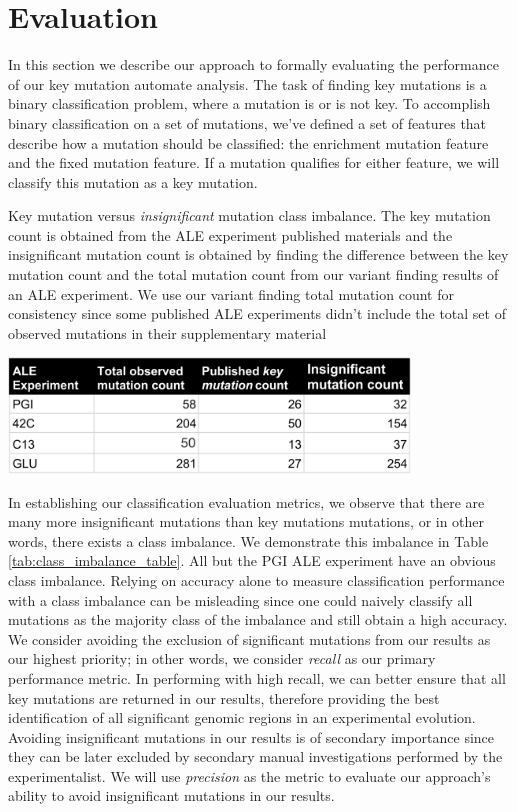 \documentclass[12pt,final,masters,chapterheads]{ucsd}  %
\begin{document}
\section{Evaluation}
In this section we describe our approach to formally evaluating the performance of our key mutation automate analysis. The task of finding key mutations is a binary classification problem, where a mutation is or is not key. To accomplish binary classification on a set of mutations, we've defined a set of features that describe how a mutation should be classified: the enrichment mutation feature and the fixed mutation feature. If a mutation qualifies for either feature, we will classify this mutation as a key mutation.
\begin{table}[H]
  \caption{Key mutation versus \textit{insignificant} mutation class imbalance. The key mutation count is obtained from the ALE experiment published materials and the insignificant mutation count is obtained by finding the difference between the key mutation count and the total mutation count from our variant finding results of an ALE experiment. We use our variant finding total mutation count for consistency since some published ALE experiments didn't include the total set of observed mutations in their supplementary material}
  \centering
  \includegraphics[width=0.8\textwidth]{class_imbalance_table.png}
  \label{tab:class_imbalance_table}
\end{table}
In establishing our classification evaluation metrics, we observe that there are many more insignificant mutations than key mutations mutations, or in other words, there exists a class imbalance. We demonstrate this imbalance in Table \ref{tab:class_imbalance_table}. All but the PGI ALE experiment have an obvious class imbalance. Relying on accuracy alone to measure classification performance with a class imbalance can be misleading since one could naively classify all mutations as the majority class of the imbalance and still obtain a high accuracy. We consider avoiding the exclusion of significant mutations from our results as our highest priority; in other words, we consider \textit{recall} as our primary performance metric. In performing with high recall, we can better ensure that all key mutations are returned in our results, therefore providing the best identification of all significant genomic regions in an experimental evolution. Avoiding insignificant mutations in our results is of secondary importance since they can be later excluded by secondary manual investigations performed by the experimentalist. We will use \textit{precision} as the metric to evaluate our approach's ability to avoid insignificant mutations in our results.
\end{document}
